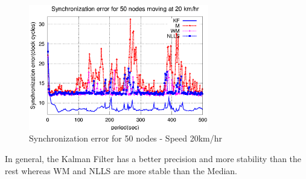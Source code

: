 \documentclass[a4paper,10pt]{report}
\begin{document}
\begin{figure}
\centering
\includegraphics[width=0.7\textwidth]{50output-s20}
\caption{Synchronization error for 50 nodes - Speed 20km/hr} \label{50output20}
\end{figure}
\newline 
In general, the Kalman Filter has a better precision and more stability than the rest whereas WM and NLLS are more stable than the Median.
\end{document}
